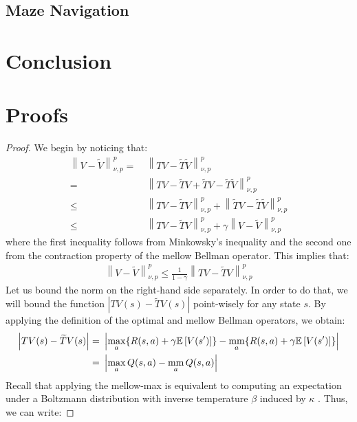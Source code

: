 \documentclass{article}
\newcommand{\mm}{\operatornamewithlimits{mm}}
\newcommand{\wt}[1]{\widetilde{#1}}
\newcommand{\norm}[1]{\left\lVert #1 \right\rVert}
\newcommand{\abs}[1]{\left\lvert #1 \right\rvert}
\begin{document}
\subsection{Maze Navigation}

\section{Conclusion}

{\small 


}

\newpage
\appendix

\section{Proofs}

\thmm*
\begin{proof}
We begin by noticing that:
\begin{align*}
\norm{V-\wt{V}}_{\nu,p}^p =\ & \norm{TV - \wt{T}\wt{V}}_{\nu,p}^p \\ =\ &
\norm{TV - \wt{T}V + \wt{T}V - \wt{T}\wt{V}}_{\nu,p}^p \\ \leq\ &
\norm{TV - \wt{T}V}_{\nu,p}^p + \norm{\wt{T}V - \wt{T}\wt{V}}_{\nu,p}^p \\ \leq\ &
\norm{TV - \wt{T}V}_{\nu,p}^p + \gamma\norm{V - \wt{V}}_{\nu,p}^p
\end{align*}
where the first inequality follows from Minkowsky's inequality and the second one from the contraction property of the mellow Bellman operator. This implies that:
\begin{align} \label{eq:mm1}
\norm{V-\wt{V}}_{\nu,p}^p \leq \frac{1}{1-\gamma}\norm{TV - \wt{T}V}_{\nu,p}^p
\end{align}
Let us bound the norm on the right-hand side separately. In order to do that, we will bound the function $\abs{TV(s) - \wt{T}V(s)}$ point-wisely for any state $s$. By applying the definition of the optimal and mellow Bellman operators, we obtain:
\begin{align*}
\abs{TV(s) - \wt{T}V(s)} =\ & \abs{\max_{a}\lbrace R(s,a) + \gamma\mathbb{E}\left[V(s')\right] \rbrace - \mm_{a}\lbrace R(s,a) + \gamma\mathbb{E}\left[V(s')\right] \rbrace}\\ =\ & \abs{\max_a Q(s,a) - \mm_a Q(s,a)}
\end{align*}
Recall that applying the mellow-max is equivalent to computing an expectation under a Boltzmann distribution with inverse temperature $\beta$ induced by $\kappa$ \cite{}. Thus, we can write:

\end{proof}
\end{document}
